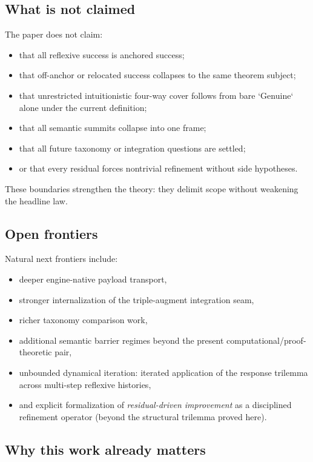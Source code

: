 \documentclass[11pt]{article}
\theoremstyle{plain}
\theoremstyle{definition}
\theoremstyle{remark}
\begin{document}
\subsection{What is not claimed}

The paper does not claim:
\begin{itemize}
\item that all reflexive success is anchored success;
\item that off-anchor or relocated success collapses to the same theorem subject;
\item that unrestricted intuitionistic four-way cover follows from bare `Genuine` alone under the current definition;
\item that all semantic summits collapse into one frame;
\item that all future taxonomy or integration questions are settled;
\item or that every residual forces nontrivial refinement without side hypotheses.
\end{itemize}

These boundaries strengthen the theory: they delimit scope without weakening the headline law.

\subsection{Open frontiers}

Natural next frontiers include:
\begin{itemize}
\item deeper engine-native payload transport,
\item stronger internalization of the triple-augment integration seam,
\item richer taxonomy comparison work,
\item additional semantic barrier regimes beyond the present computational/proof-theoretic pair,
\item unbounded dynamical iteration: iterated application of the response trilemma across multi-step reflexive histories,
\item and explicit formalization of \emph{residual-driven improvement} as a disciplined refinement operator (beyond the structural trilemma proved here).
\end{itemize}

\subsection{Why this work already matters}
\end{document}
